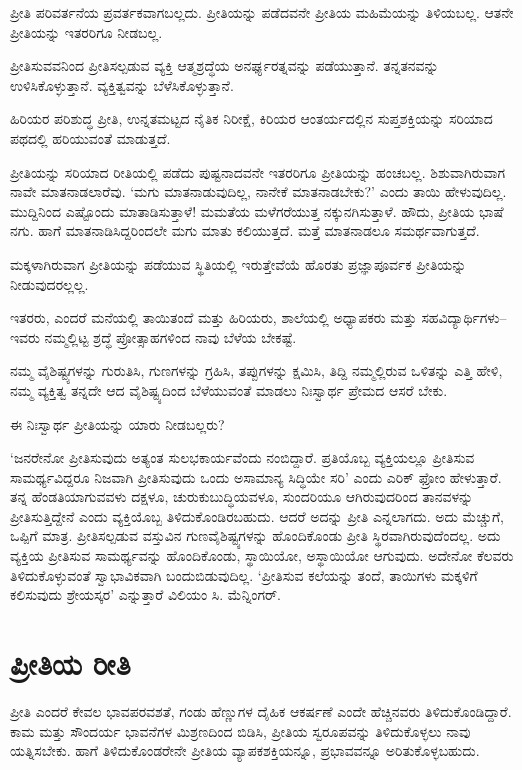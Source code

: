 ಪ್ರೀತಿ ಪರಿವರ್ತನೆಯ ಪ್ರವರ್ತಕವಾಗಬಲ್ಲದು. ಪ್ರೀತಿಯನ್ನು ಪಡೆದವನೇ ಪ್ರೀತಿಯ ಮಹಿಮೆಯನ್ನು ತಿಳಿಯಬಲ್ಲ. ಆತನೇ ಪ್ರೀತಿಯನ್ನು ಇತರರಿಗೂ ನೀಡಬಲ್ಲ.

ಪ್ರೀತಿಸುವವನಿಂದ ಪ್ರೀತಿಸಲ್ಪಡುವ ವ್ಯಕ್ತಿ ಆತ್ಮಶ್ರದ್ಧೆಯ ಅನರ್ಘ್ಯರತ್ನವನ್ನು ಪಡೆಯುತ್ತಾನೆ. ತನ್ನತನವನ್ನು ಉಳಿಸಿಕೊಳ್ಳುತ್ತಾನೆ. ವ್ಯಕ್ತಿತ್ವವನ್ನು ಬೆಳೆಸಿಕೊಳ್ಳುತ್ತಾನೆ.

ಹಿರಿಯರ ಪರಿಶುದ್ಧ ಪ್ರೀತಿ, ಉನ್ನತಮಟ್ಟದ ನೈತಿಕ ನಿರೀಕ್ಷೆ, ಕಿರಿಯರ ಆಂತರ್ಯದಲ್ಲಿನ ಸುಪ್ತಶಕ್ತಿಯನ್ನು ಸರಿಯಾದ ಪಥದಲ್ಲಿ ಹರಿಯುವಂತೆ ಮಾಡುತ್ತದೆ.

ಪ್ರೀತಿಯನ್ನು ಸರಿಯಾದ ರೀತಿಯಲ್ಲಿ ಪಡೆದು ಪುಷ್ಟನಾದವನೇ ಇತರರಿಗೂ ಪ್ರೀತಿಯನ್ನು ಹಂಚಬಲ್ಲ. ಶಿಶುವಾಗಿರುವಾಗ ನಾವೇ ಮಾತನಾಡಲಾರೆವು. ‘ಮಗು ಮಾತನಾಡುವುದಿಲ್ಲ, ನಾನೇಕೆ ಮಾತನಾಡಬೇಕು?’ ಎಂದು ತಾಯಿ ಹೇಳುವುದಿಲ್ಲ. ಮುದ್ದಿನಿಂದ ಎಷ್ಟೊಂದು ಮಾತಾಡಿ\-ಸುತ್ತಾಳೆ! ಮಮತೆಯ ಮಳೆಗರೆಯುತ್ತ ನಕ್ಕುನಗಿಸುತ್ತಾಳೆ. ಹೌದು, ಪ್ರೀತಿಯ ಭಾಷೆ ನಗು. ಹಾಗೆ ಮಾತನಾಡಿಸಿದ್ದರಿಂದಲೇ ಮಗು ಮಾತು ಕಲಿಯುತ್ತದೆ. ಮತ್ತೆ ಮಾತನಾಡಲೂ ಸಮರ್ಥ\-ವಾಗುತ್ತದೆ.

ಮಕ್ಕಳಾಗಿರುವಾಗ ಪ್ರೀತಿಯನ್ನು ಪಡೆಯುವ ಸ್ಥಿತಿಯಲ್ಲಿ ಇರುತ್ತೇವೆಯೆ ಹೊರತು ಪ್ರಜ್ಞಾ\-ಪೂರ್ವಕ ಪ್ರೀತಿಯನ್ನು ನೀಡುವುದರಲ್ಲಲ್ಲ.

ಇತರರು, ಎಂದರೆ ಮನೆಯಲ್ಲಿ ತಾಯಿತಂದೆ ಮತ್ತು ಹಿರಿಯರು, ಶಾಲೆಯಲ್ಲಿ ಅಧ್ಯಾಪಕರು ಮತ್ತು ಸಹವಿದ್ಯಾರ್ಥಿಗಳು–ಇವರು ನಮ್ಮಲ್ಲಿಟ್ಟ ಶ್ರದ್ಧೆ ಪ್ರೋತ್ಸಾಹಗಳಿಂದ ನಾವು ಬೆಳೆಯ ಬೇಕಷ್ಟೆ.

ನಮ್ಮ ವೈಶಿಷ್ಟ್ಯಗಳನ್ನು ಗುರುತಿಸಿ, ಗುಣಗಳನ್ನು ಗ್ರಹಿಸಿ, ತಪ್ಪುಗಳನ್ನು ಕ್ಷಮಿಸಿ, ತಿದ್ದಿ ನಮ್ಮ\-ಲ್ಲಿರುವ ಒಳಿತನ್ನು ಎತ್ತಿ ಹೇಳಿ, ನಮ್ಮ ವ್ಯಕ್ತಿತ್ವ ತನ್ನದೇ ಆದ ವೈಶಿಷ್ಟ್ಯದಿಂದ ಬೆಳೆಯುವಂತೆ ಮಾಡಲು ನಿಃಸ್ವಾರ್ಥ ಪ್ರೇಮದ ಆಸರೆ ಬೇಕು.

ಈ ನಿಃಸ್ವಾರ್ಥ ಪ್ರೀತಿಯನ್ನು ಯಾರು ನೀಡಬಲ್ಲರು?

‘ಜನರೇನೋ ಪ್ರೀತಿಸುವುದು ಅತ್ಯಂತ ಸುಲಭಕಾರ್ಯವೆಂದು ನಂಬಿದ್ದಾರೆ. ಪ್ರತಿಯೊಬ್ಬ ವ್ಯಕ್ತಿಯಲ್ಲೂ ಪ್ರೀತಿಸುವ ಸಾಮರ್ಥ್ಯವಿದ್ದರೂ ನಿಜವಾಗಿ ಪ್ರೀತಿಸುವುದು ಒಂದು ಅಸಾಮಾನ್ಯ ಸಿದ್ಧಿಯೇ ಸರಿ’ ಎಂದು ಎರಿಕ್ ಫ್ರೋಂ ಹೇಳುತ್ತಾರೆ. ತನ್ನ ಹೆಂಡತಿಯಾಗುವವಳು ದಕ್ಷಳೂ, ಚುರುಕುಬುದ್ಧಿಯವಳೂ, ಸುಂದರಿಯೂ ಆಗಿರುವುದರಿಂದ ತಾನವಳನ್ನು ಪ್ರೀತಿಸುತ್ತಿದ್ದೇನೆ ಎಂದು ವ್ಯಕ್ತಿಯೊಬ್ಬ ತಿಳಿದುಕೊಂಡಿರಬಹುದು. ಆದರೆ ಅದನ್ನು ಪ್ರೀತಿ ಎನ್ನಲಾಗದು. ಅದು ಮೆಚ್ಚುಗೆ, ಒಪ್ಪಿಗೆ ಮಾತ್ರ. ಪ್ರೀತಿಸಲ್ಪಡುವ ವಸ್ತುವಿನ ಗುಣವೈಶಿಷ್ಟ್ಯಗಳನ್ನು ಹೊಂದಿಕೊಂಡು ಪ್ರೀತಿ ಸ್ಥಿರವಾಗಿರುವುದೆಂದಲ್ಲ. ಅದು ವ್ಯಕ್ತಿಯ ಪ್ರೀತಿಸುವ ಸಾಮರ್ಥ್ಯವನ್ನು ಹೊಂದಿಕೊಂಡು, ಸ್ಥಾಯಿಯೋ, ಅಸ್ಥಾಯಿಯೋ ಆಗುವುದು. ಅದೇನೋ ಕೆಲವರು ತಿಳಿದುಕೊಳ್ಳುವಂತೆ ಸ್ವಾಭಾವಿಕವಾಗಿ ಬಂದುಬಿಡುವುದಿಲ್ಲ. ‘ಪ್ರೀತಿಸುವ ಕಲೆಯನ್ನು ತಂದೆ, ತಾಯಿಗಳು ಮಕ್ಕಳಿಗೆ ಕಲಿಸುವುದು ಶ್ರೇಯಸ್ಕರ’ ಎನ್ನುತ್ತಾರೆ ವಿಲಿಯಂ ಸಿ. ಮೆನ್ನಿಂಗರ್.


\section*{ಪ್ರೀತಿಯ ರೀತಿ}


ಪ್ರೀತಿ ಎಂದರೆ ಕೇವಲ ಭಾವಪರವಶತೆ, ಗಂಡು ಹೆಣ್ಣುಗಳ ದೈಹಿಕ ಆಕರ್ಷಣೆ ಎಂದೇ ಹೆಚ್ಚಿನವರು ತಿಳಿದುಕೊಂಡಿದ್ದಾರೆ. ಕಾಮ ಮತ್ತು ಸೌಂದರ್ಯ ಭಾವನೆಗಳ ಮಿಶ್ರಣದಿಂದ ಬಿಡಿಸಿ, ಪ್ರೀತಿಯ ಸ್ವರೂಪವನ್ನು ತಿಳಿದುಕೊಳ್ಳಲು ನಾವು ಯತ್ನಿಸಬೇಕು. ಹಾಗೆ ತಿಳಿದುಕೊಂಡರೇನೇ ಪ್ರೀತಿಯ ವ್ಯಾಪಕಶಕ್ತಿಯನ್ನೂ, ಪ್ರಭಾವವನ್ನೂ ಅರಿತುಕೊಳ್ಳಬಹುದು.

